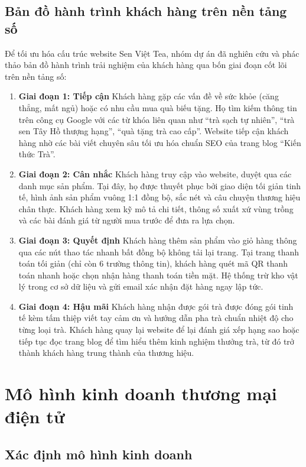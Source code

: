\subsection{Bản đồ hành trình khách hàng trên nền tảng số}
Để tối ưu hóa cấu trúc website Sen Việt Tea, nhóm dự án đã nghiên cứu và phác thảo bản đồ hành trình trải nghiệm của khách hàng qua bốn giai đoạn cốt lõi trên nền tảng số:
\begin{enumerate}
    \item \textbf{Giai đoạn 1: Tiếp cận}
    Khách hàng gặp các vấn đề về sức khỏe (căng thẳng, mất ngủ) hoặc có nhu cầu mua quà biếu tặng. Họ tìm kiếm thông tin trên công cụ Google với các từ khóa liên quan như ``trà sạch tự nhiên'', ``trà sen Tây Hồ thượng hạng'', ``quà tặng trà cao cấp''. Website tiếp cận khách hàng nhờ các bài viết chuyên sâu tối ưu hóa chuẩn SEO của trang blog ``Kiến thức Trà''.
    \item \textbf{Giai đoạn 2: Cân nhắc}
    Khách hàng truy cập vào website, duyệt qua các danh mục sản phẩm. Tại đây, họ được thuyết phục bởi giao diện tối giản tinh tế, hình ảnh sản phẩm vuông 1:1 đồng bộ, sắc nét và câu chuyện thương hiệu chân thực. Khách hàng xem kỹ mô tả chi tiết, thông số xuất xứ vùng trồng và các bài đánh giá từ người mua trước để đưa ra lựa chọn.
    \item \textbf{Giai đoạn 3: Quyết định}
    Khách hàng thêm sản phẩm vào giỏ hàng thông qua các nút thao tác nhanh bất đồng bộ không tải lại trang. Tại trang thanh toán tối giản (chỉ còn 6 trường thông tin), khách hàng quét mã QR thanh toán nhanh hoặc chọn nhận hàng thanh toán tiền mặt. Hệ thống trừ kho vật lý trong cơ sở dữ liệu và gửi email xác nhận đặt hàng ngay lập tức.
    \item \textbf{Giai đoạn 4: Hậu mãi}
    Khách hàng nhận được gói trà được đóng gói tinh tế kèm tấm thiệp viết tay cảm ơn và hướng dẫn pha trà chuẩn nhiệt độ cho từng loại trà. Khách hàng quay lại website để lại đánh giá xếp hạng sao hoặc tiếp tục đọc trang blog để tìm hiểu thêm kinh nghiệm thưởng trà, từ đó trở thành khách hàng trung thành của thương hiệu.
\end{enumerate}



\section{Mô hình kinh doanh thương mại điện tử}

\subsection{Xác định mô hình kinh doanh}

